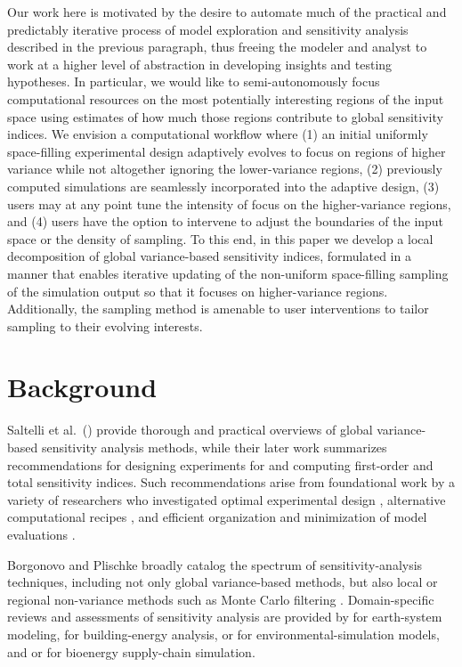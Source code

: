 \documentclass[12pt]{article}
\begin{document}
Our work here is motivated by the desire to automate much of the practical and predictably iterative process of model exploration and sensitivity analysis described in the previous paragraph, thus freeing the modeler and analyst to work at a higher level of abstraction in developing insights and testing hypotheses. In particular, we would like to semi-autonomously focus computational resources on the most potentially interesting regions of the input space using estimates of how much those regions contribute to global sensitivity indices. We envision a computational workflow where (1) an initial uniformly space-filling experimental design adaptively evolves to focus on regions of higher variance while not altogether ignoring the lower-variance regions, (2) previously computed simulations are seamlessly incorporated into the adaptive design, (3) users may at any point tune the intensity of focus on the higher-variance regions, and (4) users have the option to intervene to adjust the boundaries of the input space or the density of sampling.
To this end, in this paper we develop a local decomposition of global variance-based sensitivity indices, formulated in a manner that enables iterative updating of the non-uniform space-filling sampling of the simulation output so that it focuses on higher-variance regions. Additionally, the sampling method is amenable to user interventions to tailor sampling to their evolving interests.


\section{Background}
\label{sec:back}

Saltelli et al.\  (\citeyear{saltelli_sensitivity_2004,saltelli_global_2008}) provide thorough and practical overviews of global variance-based sensitivity analysis methods, while their later work \citep{saltelli_variance_2010} summarizes recommendations for designing experiments for and computing first-order and total sensitivity indices. Such recommendations arise from foundational work by a variety of researchers who investigated optimal experimental design \citep{jansen_analysis_1999,saltelli_variance_2010}, alternative computational recipes \citep{saltelli_variance_2010}, and efficient organization and minimization of model evaluations \citep{saltelli_making_2002,piano_new_2019,kucherenko_estimation_2012}.

Borgonovo and Plischke \citet{borgonovo_sensitivity_2016} broadly catalog the spectrum of sensitivity-analysis techniques, including not only global variance-based methods, but also local or regional non-variance methods such as Monte Carlo filtering \citep{wu_application_2017}. Domain-specific reviews and assessments of sensitivity analysis are provided by \citet{wagener_what_2019} for earth-system modeling, \citet{tian_review_2013} for building-energy analysis, \citet{norton_introduction_2015} or \citet{pianosi_sensitivity_2016} for environmental-simulation models, and \citet{jadun_application_2017} or \citet{inman_application_2018} for bioenergy supply-chain simulation.
\end{document}

